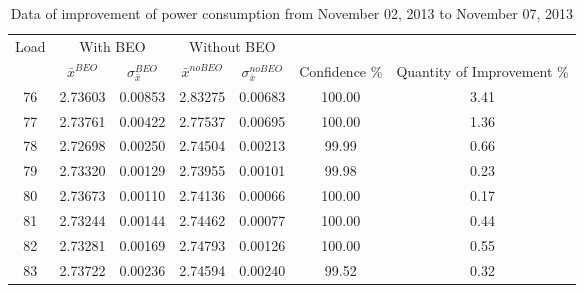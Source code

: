 \begin{table}[H]
\scriptsize
  \begin{center}
    \begin{tabular}{c c c c c c c}
    \toprule
    \multirow{2}{*}{Load} & \multicolumn{2}{c}{With BEO} & \multicolumn{2}{c}{Without BEO} & \\[0.2cm]
    \cmidrule{2-7}
     & $\bar{x}^{BEO}$ & $\sigma_{\bar{x}}^{BEO}$ & $\bar{x}^{noBEO}$ & $\sigma_{\bar{x}}^{noBEO}$ & Confidence \% & Quantity of Improvement \%\\
    \midrule
	76 & 2.73603 & 0.00853 & 2.83275 & 0.00683 & 100.00 & 3.41\\
    77 & 2.73761 & 0.00422 & 2.77537 & 0.00695 & 100.00 & 1.36\\
    78 & 2.72698 & 0.00250 & 2.74504 & 0.00213 & 99.99 & 0.66\\
    79 & 2.73320 & 0.00129 & 2.73955 & 0.00101 & 99.98 & 0.23\\
    80 & 2.73673 & 0.00110 & 2.74136 & 0.00066 & 100.00 & 0.17\\
    81 & 2.73244 & 0.00144 & 2.74462 & 0.00077 & 100.00 & 0.44\\
    82 & 2.73281 & 0.00169 & 2.74793 & 0.00126 & 100.00 & 0.55\\
    83 & 2.73722 & 0.00236 & 2.74594 & 0.00240 & 99.52 & 0.32\\
	\bottomrule
	\end{tabular}
    \caption{Data of improvement of power consumption from November 02, 2013 to November 07, 2013}
    \label{App:table02} 
  \end{center} 
\end{table}

